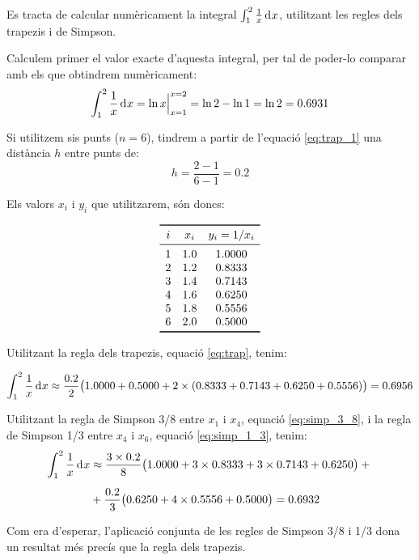 \begin{exemple}
    Es tracta de calcular numèricament la integral $\int_1^2 \frac{1}{x} \diff x$, utilitzant les regles dels trapezis i de Simpson.

    Calculem primer el valor exacte d'aquesta integral, per tal de poder-lo comparar amb els que obtindrem  numèricament:
    \[
      \int_1^2 \frac{1}{x} \diff x = \ln x \Bigr|_{x=1}^{x=2} = \ln 2 - \ln 1 = \ln 2 = \num{0,6931}
    \]

    Si utilitzem sis punts ($n=6$), tindrem a partir de l'equació \eqref{eq:trap_1} una distància $h$ entre punts de:
    \[
        h = \frac{2-1}{6-1} = \num{0,2}
    \]

    Els valors $x_i$ i $y_i$ que utilitzarem, són doncs:
    \vspace{-8mm}
    \begin{center}
        \[\begin{array}{ccc}
           \toprule[1pt]
              i & x_i  & y_i = 1/x_i \\
           \midrule
              1 & \num{1,0} & \num{1,0000} \\
              2 & \num{1,2} & \num{0,8333} \\
              3 & \num{1,4} & \num{0,7143} \\
              4 & \num{1,6} & \num{0.6250} \\
              5 & \num{1,8} & \num{0.5556} \\
              6 & \num{2,0} & \num{0,5000} \\
           \bottomrule[1pt]
        \end{array} \]
    \end{center}

    \pagebreak
    Utilitzant la regla dels trapezis, equació \eqref{eq:trap}, tenim:

    \[
        \int_1^2 \frac{1}{x} \diff x \approx \frac{\num{0,2}}{2} \big(\num{1,0000}+\num{0,5000} +2 \times(\num{0,8333}+ \num{0,7143} +
        \num{0,6250} + \num{0,5556}) \big) = \num{0,6956}
    \]

    Utilitzant la regla de Simpson 3/8 entre $x_1$ i $x_4$, equació \eqref{eq:simp_3_8}, i la  regla de Simpson 1/3 entre $x_4$ i $x_6$, equació \eqref{eq:simp_1_3}, tenim:
    \[\begin{split}
        \int_1^2 \frac{1}{x} \diff x &\approx \frac{3\times\num{0,2}}{8} \big(\num{1,0000}+3\times\num{0,8333} +3\times \num{0,7143} +
        \num{0,6250} \big) +{}\\[0.5em]
        {}&+ \frac{\num{0,2}}{3} \big(\num{0,6250} +4\times \num{0,5556} + \num{0,5000} \big)
        = \num{0,6932}
    \end{split}\]

    Com era d'esperar, l'aplicació conjunta de les regles de Simpson 3/8 i 1/3 dona un resultat més precís que la regla dels trapezis.
\end{exemple}


